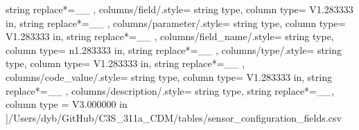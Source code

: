 \begin{landscape}
{            string replace*={_}{\_}
        },
    columns/field/.style={
            string type, 
            column type= V{1.283333 in}, 
            string replace*={_}{\_}
        },
    columns/parameter/.style={
            string type, 
            column type= V{1.283333 in}, 
            string replace*={_}{\_}
        },
    columns/field_name/.style={
            string type, 
            column type= n{1.283333 in}, 
            string replace*={_}{\_}
        },
    columns/type/.style={
            string type, 
            column type= V{1.283333 in}, 
            string replace*={_}{\_}
        },
    columns/code_value/.style={
            string type, 
            column type= V{1.283333 in}, 
            string replace*={_}{\_}
        },
    columns/description/.style={
            string type, 
            string replace*={_}{\_},
            column type = V{3.000000 in}
        }
    ]{/Users/dyb/GitHub/C3S_311a_CDM/tables/sensor_configuration_fields.csv}
\end{landscape}
